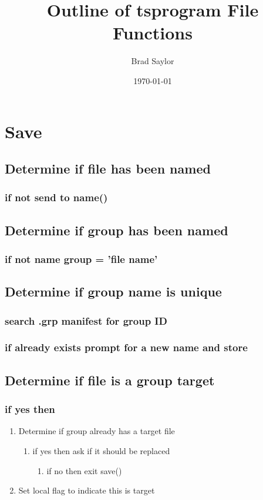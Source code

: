 \documentclass[11pt]{article}
\author{Brad Saylor}
\date{\today}
\title{Outline of tsprogram File Functions}
\begin{document}
\maketitle

\section{Save}
\label{sec-1}
\subsection{Determine if file has been named}
\label{sec-1-1}
\subsubsection{if not send to name()}
\label{sec-1-1-1}
\subsection{Determine if group has been named}
\label{sec-1-2}
\subsubsection{if not name group = 'file name'}
\label{sec-1-2-1}
\subsection{Determine if group name is unique}
\label{sec-1-3}
\subsubsection{search .grp manifest for group ID}
\label{sec-1-3-1}
\subsubsection{if already exists prompt for a new name and store}
\label{sec-1-3-2}
\subsection{Determine if file is a group target}
\label{sec-1-4}
\subsubsection{if yes then}
\label{sec-1-4-1}
\begin{enumerate}
\item Determine if group already has a target file
\label{sec-1-4-1-1}
\begin{enumerate}
\item if yes then ask if it should be replaced
\label{sec-1-4-1-1-1}
\begin{enumerate}
\item if no then exit save()
\label{sec-1-4-1-1-1-1}
\end{enumerate}
\end{enumerate}
\item Set local flag to indicate this is target
\label{sec-1-4-1-2}
\end{enumerate}
\end{document}
